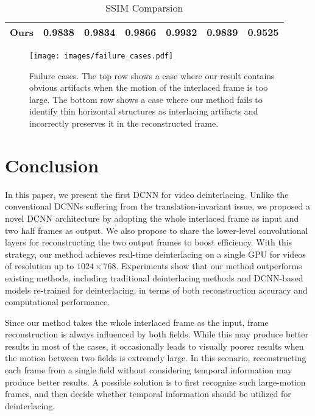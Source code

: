 \documentclass[acmtog]{acmart}
\begin{document}
\begin{table*}
\begin{tabular}{|c|c|c|c|c|c|c|}
		Ours    & \textbf{0.9838} & \textbf{0.9834}  & 0.9866     			& \textbf{0.9932}  &\textbf{0.9839 } & \textbf{0.9525 } \\ \hline
	\end{tabular}
	\caption{SSIM Comparsion}
	\label{tab:ssim_comparsion}
\end{table*}\fi\begin{figure}[!tp]
	\centering
	\texttt{[image: images/failure\_cases.pdf]}\\
	\caption{Failure cases. The top row shows a case where our result contains obvious artifacts when the motion of the interlaced frame is too large. The bottom row shows a case where our method fails to identify thin horizontal structures as interlacing artifacts and incorrectly preserves it in the reconstructed frame.}\label{fig:failure_cases}
\end{figure}
\section{Conclusion}
In this paper, we present the first DCNN for video deinterlacing. Unlike
the conventional DCNNs suffering from the translation-invariant issue, we
proposed a novel DCNN architecture by adopting the whole interlaced frame as
input and two half frames as output. We also propose to share the lower-level
convolutional layers for reconstructing the two output frames to boost  
efficiency. With this strategy, our method achieves real-time deinterlacing
on a single GPU for videos of resolution up to $1024\times768$.
Experiments show that our method outperforms existing methods,
including traditional deinterlacing methods and DCNN-based models re-trained for
deinterlacing, in terms of both reconstruction accuracy and computational
performance.

Since our method takes the whole interlaced frame as the input, frame
reconstruction is always influenced by both fields. While this may produce
better results in most of the cases, it occasionally leads to visually poorer
results when the
motion between two fields is extremely large. In this scenario, reconstructing
each frame from a single field without considering temporal information may
produce better results. A possible solution is to first recognize such large-motion
frames, and then decide whether temporal information should be utilized for 
deinterlacing.




\end{document}
